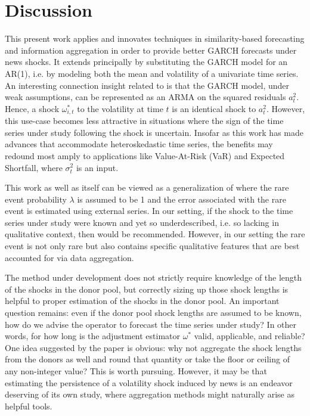 \documentclass[11pt,3p,review,authoryear]{elsarticle}
\theoremstyle{definition}
\begin{document}
\section{Discussion}

This present work applies and innovates techniques in similarity-based forecasting and information aggregation in order to provide better GARCH forecasts under news shocks.  It extends \citet{lin2021minimizing} principally by substituting the GARCH model for an AR(1), i.e. by modeling both the mean and volatility of a univariate time series.  An interesting connection insight related to \citet{lin2021minimizing} is that the GARCH model, under weak assumptions, can be represented as an ARMA on the squared residuals $a^{2}_{t}$.  Hence, a shock $\omega^{*}_{i,t}$ to the volatility at time $t$ is an identical shock to $a^{2}_{t}$. However, this use-case becomes less attractive in situations where the sign of the time series under study following the shock is uncertain.  Insofar as this work has made advances that accommodate heteroskedastic time series, the benefits may redound most amply to applications like Value-At-Risk (VaR) and Expected Shortfall, where $\sigma^{2}_{t}$ is an input.

This work as well as \citet{lin2021minimizing} itself can be viewed as a generalization of \cite{phillips1996forecasting} where the rare event probability $\lambda$ is assumed to be 1 and the error associated with the rare event is estimated using external series.  In our setting, if the shock to the time series under study were known and yet so underdescribed, i.e. so lacking in qualitative context, then \cite{phillips1996forecasting} would be recommended.  However, in our setting the rare event is not only rare but also contains specific qualitative features that are best accounted for via data aggregation.

The method under development does not strictly require knowledge of the length of the shocks in the donor pool, but correctly sizing up those shock lengths is helpful to proper estimation of the shocks in the donor pool.  An important question remains: even if the donor pool shock lengths are assumed to be known, how do we advise the operator to forecast the time series under study?  In other words, for how long is the adjustment estimator $\omega^{*}$ valid, applicable, and reliable?  One idea suggested by the paper is obvious: why not aggregate the shock lengths from the donors as well and round that quantity or take the floor or ceiling of any non-integer value?  This is worth pursuing.  However, it may be that estimating the persistence of a volatility shock induced by news is an endeavor deserving of its own study, where aggregation methods might naturally arise as helpful tools.
\end{document}
